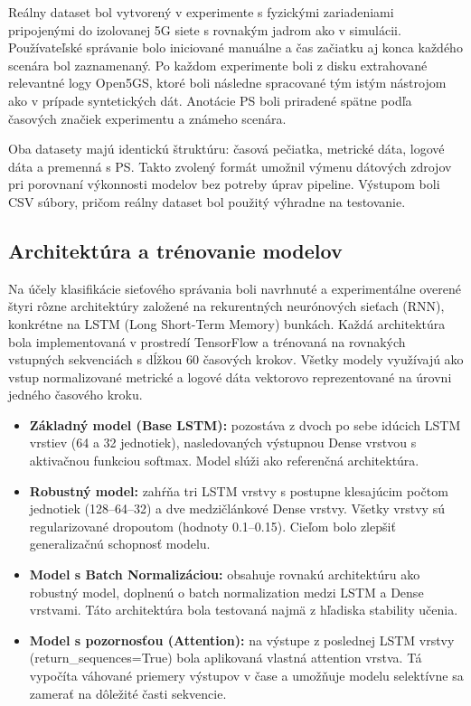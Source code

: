 \documentclass[a4paper,conference]{IEEEtran}
\begin{document}
Reálny dataset bol vytvorený v experimente s fyzickými zariadeniami pripojenými do izolovanej 5G siete s rovnakým jadrom ako v simulácii. Používateľské správanie bolo iniciované manuálne a čas začiatku aj konca každého scenára bol zaznamenaný. Po každom experimente boli z disku extrahované relevantné logy Open5GS, ktoré boli následne spracované tým istým nástrojom ako v prípade syntetických dát. Anotácie PS boli priradené spätne podľa časových značiek experimentu a známeho scenára.

Oba datasety majú identickú štruktúru: časová pečiatka, metrické dáta, logové dáta a premenná s PS. Takto zvolený formát umožnil výmenu dátových zdrojov pri porovnaní výkonnosti modelov bez potreby úprav pipeline. Výstupom boli CSV súbory, pričom reálny dataset bol použitý výhradne na testovanie.

\subsection{Architektúra a trénovanie modelov}
\label{subsec2}

Na účely klasifikácie sieťového správania boli navrhnuté a experimentálne overené štyri rôzne architektúry založené na rekurentných neurónových sieťach (RNN), konkrétne na LSTM (Long Short-Term Memory) bunkách. Každá architektúra bola implementovaná v prostredí TensorFlow a trénovaná na rovnakých vstupných sekvenciách s dĺžkou 60 časových krokov. Všetky modely využívajú ako vstup normalizované metrické a logové dáta vektorovo reprezentované na úrovni jedného časového kroku.

\begin{itemize}
\item \textbf{Základný model (Base LSTM):} pozostáva z dvoch po sebe idúcich LSTM vrstiev (64 a 32 jednotiek), nasledovaných výstupnou Dense vrstvou s aktivačnou funkciou softmax. Model slúži ako referenčná architektúra.
\item \textbf{Robustný model:} zahŕňa tri LSTM vrstvy s postupne klesajúcim počtom jednotiek (128–64–32) a dve medzičlánkové Dense vrstvy. Všetky vrstvy sú regularizované dropoutom (hodnoty 0.1–0.15). Cieľom bolo zlepšiť generalizačnú schopnosť modelu.
\item \textbf{Model s Batch Normalizáciou:} obsahuje rovnakú architektúru ako robustný model, doplnenú o batch normalization medzi LSTM a Dense vrstvami. Táto architektúra bola testovaná najmä z hľadiska stability učenia.
\item \textbf{Model s pozornosťou (Attention):} na výstupe z poslednej LSTM vrstvy (return\_sequences=True) bola aplikovaná vlastná attention vrstva. Tá vypočíta váhované priemery výstupov v čase a umožňuje modelu selektívne sa zamerať na dôležité časti sekvencie.
\end{itemize}
\end{document}

